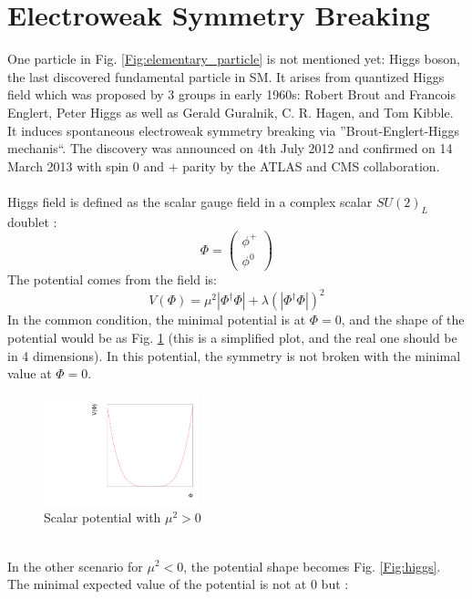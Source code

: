 \section{Electroweak Symmetry Breaking}
One particle in Fig. \ref{Fig:elementary_particle} is not mentioned yet: Higgs boson, the last discovered fundamental particle in SM. It 
arises from quantized Higgs field which was proposed by 3 groups in early 1960s:  Robert Brout and Francois Englert, Peter Higgs as well as Gerald Guralnik, C. R. Hagen, and Tom Kibble. It induces spontaneous electroweak symmetry breaking via ''Brout-Englert-Higgs mechanis``.  The discovery was announced on 4th July 2012 and confirmed on 14 March 2013 with spin 0 and $+$ parity by the ATLAS and CMS collaboration.
\\
\\Higgs field is defined as the scalar gauge field in a complex scalar $SU(2)_L$ doublet :
\begin{equation}
 \Phi= \left(  \begin{array}{ c } \phi^+\\  \phi^0 \end{array} \right) 
\end{equation}
The potential comes from the field is:
\begin{equation}
 V(\Phi)=\mu^2|\Phi^\dagger\Phi|+\lambda(|\Phi^\dagger\Phi|)^2
\label{Eq:sm_higgs_potential}
\end{equation}
In the common condition, the minimal potential is at $\Phi = 0$, and the shape of the potential would be as Fig. \ref{Fig:V} (this is a simplified plot, and the real one should be in 4 dimensions). In this potential, the symmetry is not broken with the minimal value at $\Phi = 0$.
\\ 
\begin{figure}[!h]                
	\includegraphics[width=0.4\textwidth]{Chapter1/V.pdf}
	\centering
	\begin{center}
		\caption{Scalar potential with $\mu^2 > 0$}
		\label{Fig:V}            
	\end{center}
\end{figure}
\\In the other scenario for $\mu^2 < 0$, the potential shape becomes Fig. \ref{Fig:higgs}. The minimal expected value of the potential is not at 0 but :
